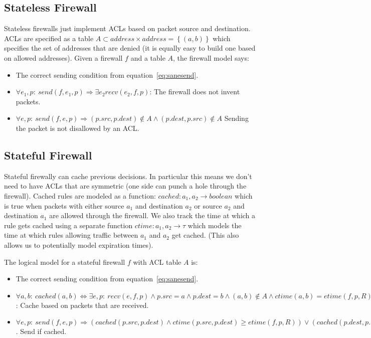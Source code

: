 \subsection{Stateless Firewall}
Stateless firewalls just implement ACLs based on packet source and destination. ACLs are specified as a table $A \subset
address\times address = \left\{(a, b)\right\}$ which specifies the set of addresses that are denied (it is equally easy
to build one based on allowed addresses). Given a firewall $f$ and a table $A$, the firewall model says:

\begin{itemize}
\item The correct sending condition from equation~\ref{eq:sanesend}.
\item $\forall e_1, p:\ send(f, e_1, p) \Rightarrow \exists e_2 recv(e_2, f, p)$: The firewall does not invent packets.
\item $\forall e, p:\ send(f, e, p) \Rightarrow (p.src, p.dest) \not \in A \land (p.dest, p.src) \not \in A$ Sending the packet is not disallowed by an
ACL.
\end{itemize}

\subsection{Stateful Firewall}
Stateful firewally can cache previous decisions. In particular this means we don't need to have ACLs that are symmetric
(one side can punch a hole through the firewall). Cached rules are modeled as a function: $cached: a_1, a_2 \rightarrow
boolean$ which is true when packets with either source $a_1$ and destination $a_2$ or source $a_2$ and destination $a_1$
are allowed through the firewall. We also track the time at which a rule gets cached using a separate function $ctime:
a_1, a_2 \rightarrow \tau$ which models the time at which rules allowing traffic between $a_1$ and $a_2$ get cached.
(This also allows us to potentially model expiration times).

The logical model for a stateful firewall $f$ with ACL table $A$ is:

\begin{itemize}
\item The correct sending condition from equation~\ref{eq:sanesend}.
\item $\forall a, b:\ cached(a, b) \iff \exists e, p:\ recv(e, f, p) \land p.src = a \land p.dest = b\land (a, b) \not
    \in A \land ctime(a, b) = etime(f, p, R)$: Cache based on packets that are received.
\item $\forall e, p:\ send(f, e, p) \Rightarrow (cached(p.src, p.dest) \land ctime(p.src, p.dest) \geq etime(f, p, R))
    \lor (cached(p.dest, p.src) \land ctime(p.dest, p.src) \geq etime(f, p, R))$. Send if cached.
\end{itemize}

